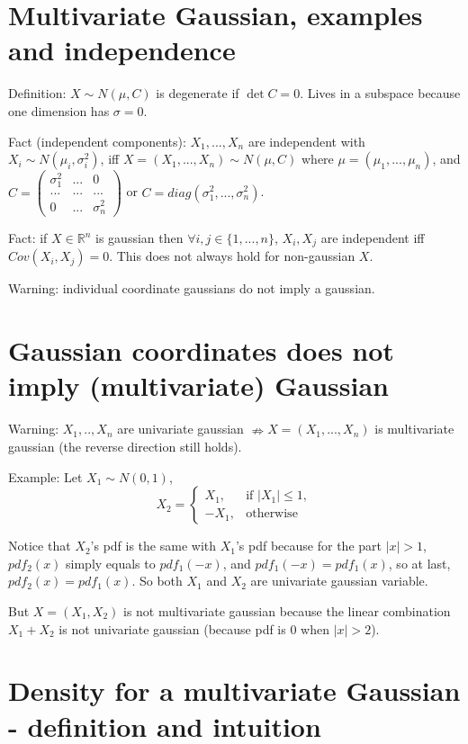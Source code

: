 \documentclass[12pt]{article}
\begin{document}
\section{Multivariate Gaussian, examples and independence}

Definition: $X\sim N(\mu,C)$ is degenerate if $\det C = 0$.
Lives in a subspace because one dimension has $\sigma=0$.

Fact (independent components): $X_1,...,X_n$ are independent
with $X_i\sim N(\mu_i,\sigma_i^2)$,
iff $X=(X_1,...,X_n)\sim N(\mu,C)$ where $\mu=(\mu_1,...,\mu_n)$,
and $C=
\begin{pmatrix}
    \sigma_1^2 & ... & 0 \\
    ... & ... & ... \\
    0 & ... & \sigma_n^2
\end{pmatrix}$
or $C=diag(\sigma_1^2,...,\sigma_n^2)$.

Fact: if $X\in\mathbb{R}^n$ is gaussian then $\forall i,j\in\{1,...,n\}$,
$X_i,X_j$ are independent iff $Cov(X_i,X_j)=0$.
This does not always hold for non-gaussian $X$.

Warning: individual coordinate gaussians
do not imply a gaussian.

\section{Gaussian coordinates does not imply (multivariate) Gaussian}

Warning: $X_1,..,X_n$ are univariate gaussian $\nRightarrow X=(X_1,...,X_n)$ is
multivariate gaussian (the reverse direction still holds).

Example: Let $X_1\sim N(0,1)$,
\begin{equation}
    X_2 = \begin{cases}
        X_1, & \text{if $|X_1|\le 1$},\\
        -X_1, & \text{otherwise}
    \end{cases}
\end{equation}

Notice that $X_2$'s pdf is the same
with $X_1$'s pdf because for the part $|x|>1$,
$pdf_2(x)$ simply equals to $pdf_1(-x)$,
and $pdf_1(-x)=pdf_1(x)$, so at last,
$pdf_2(x)=pdf_1(x)$. So both $X_1$
and $X_2$ are univariate gaussian variable.

But $X=(X_1,X_2)$ is not multivariate gaussian
because the linear combination $X_1 + X_2$ is not
univariate gaussian (because pdf is 0 when $|x|>2$).

\section{Density for a multivariate Gaussian - definition and intuition}
\end{document}
